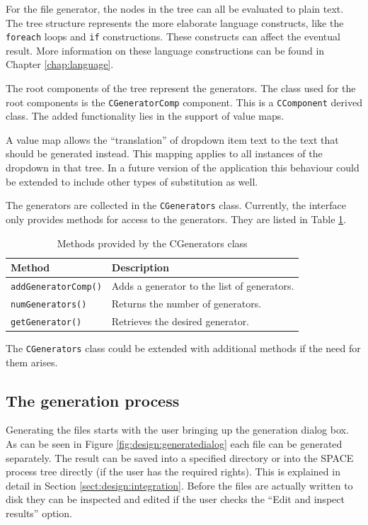 For the file generator, the nodes in the tree can all be evaluated to plain
text. The tree structure represents the more elaborate language constructs,
like the \verb=foreach= loops and \verb=if= constructions. These constructs can
affect the eventual result. More information on these language constructions
can be found in Chapter \ref{chap:language}.

\bigskip \noindent
The root components of the tree represent the generators. The class used for
the root components is the \verb=CGeneratorComp= component. This is a
\verb=CComponent= derived class. The added functionality lies in the support of
value maps.

A value map allows the ``translation'' of dropdown item text to the text that
should be generated instead. This mapping applies to all instances of the
dropdown in that tree. In a future version of the application this behaviour
could be extended to include other types of substitution as well.

\bigskip \noindent
The generators are collected in the \verb=CGenerators= class. Currently, the
interface only provides methods for access to the generators. They are listed
in Table \ref{tab:design:CGenerators}.

\begin{table} \begin{center}
\caption{Methods provided by the CGenerators class}
\label{tab:design:CGenerators}
\begin{tabular}{l|l}
\hline
 \textsf{Method}          & \textsf{Description}  \\
\hline
 \verb=addGeneratorComp()=       & Adds a generator to the list of generators.\\
 \verb=numGenerators()=          & Returns the number of generators. \\
 \verb=getGenerator()=           & Retrieves the desired generator.\\
\hline
\end{tabular} \end{center} \end{table}

The \verb=CGenerators= class could be extended with additional methods if the
need for them arises.

\subsection{The generation process}
Generating the files starts with the user bringing up the generation dialog
box. As can be seen in Figure \ref{fig:design:generatedialog} each file can be
generated separately. The result can be saved into a specified directory or
into the SPACE process tree directly (if the user has the required rights).
This is explained in detail in Section \ref{sect:design:integration}. Before
the files are actually written to disk they can be inspected and edited if the
user checks the ``Edit and inspect results'' option.

